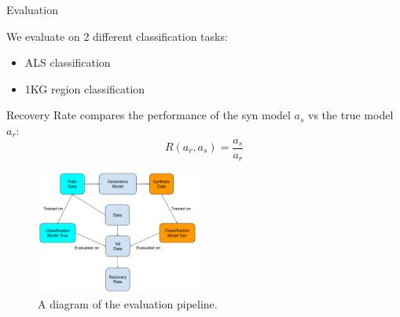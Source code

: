 \documentclass[compress, aspectratio=169]{beamer}
\begin{document}
\begin{frame}{Evaluation}
\begin{multicols}{2}
    We evaluate on 2 different classification tasks: 
\begin{itemize}
    \item ALS classification
    \item 1KG region classification
\end{itemize}

Recovery Rate compares the performance of the syn model $a_s$ vs the true model $a_r$:
\begin{equation}
    R(a_r,a_s) = \frac{a_s}{a_r}
\end{equation}
    \columnbreak
\begin{figure}
    \centering
     \includegraphics[width = 0.48\textwidth]{figures/Recovery Rate.pdf}
    \caption{A diagram of the evaluation pipeline.}
    \label{fig:unet}
\end{figure}
\end{multicols}


\end{frame}
\end{document}
